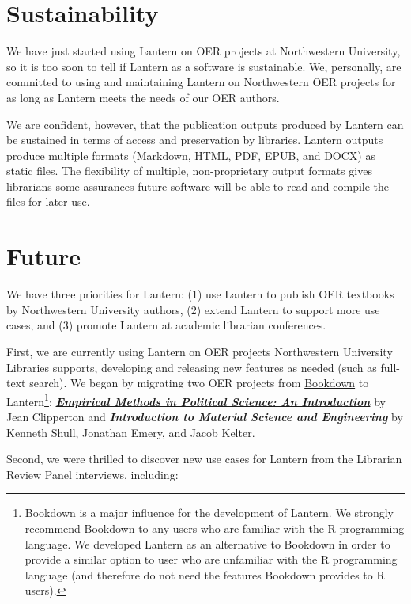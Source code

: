 \documentclass[
  11pt,
  openany]{book}
\begin{document}
\hypertarget{sustainability}{%
\section{Sustainability}\label{sustainability}}

We have just started using Lantern on OER projects at Northwestern University,
so it is too soon to tell if Lantern as a software is sustainable. We,
personally, are committed to using and maintaining Lantern on Northwestern OER
projects for as long as Lantern meets the needs of our OER authors.

We are confident, however, that the publication outputs produced by Lantern
can be sustained in terms of access and preservation by libraries. Lantern
outputs produce multiple formats (Markdown, HTML, PDF, EPUB, and DOCX) as
static files. The flexibility of multiple, non-proprietary output formats
gives librarians some assurances future software will be able to read and
compile the files for later use.

\hypertarget{future}{%
\section{Future}\label{future}}

We have three priorities for Lantern: (1) use Lantern to publish OER textbooks
by Northwestern University authors, (2) extend Lantern to support more use
cases, and (3) promote Lantern at academic librarian conferences.

First, we are currently using Lantern on OER projects Northwestern University
Libraries supports, developing and releasing new features as needed (such as
full-text search). We began by migrating two OER projects from
\href{https://bookdown.org/}{Bookdown} to Lantern\footnote{Bookdown is a major
  influence for the development of Lantern. We strongly recommend Bookdown to
  any users who are familiar with the R programming language. We developed
  Lantern as an alternative to Bookdown in order to provide a similar option
  to user who are unfamiliar with the R programming language (and therefore do
  not need the features Bookdown provides to R users).}:
\href{https://emps.northwestern.pub/}{\textbf{\emph{Empirical Methods in
Political Science: An Introduction}}} by Jean Clipperton and
\textbf{\emph{Introduction to Material Science and Engineering}} by Kenneth
Shull, Jonathan Emery, and Jacob Kelter.

Second, we were thrilled to discover new use cases for Lantern from the
Librarian Review Panel interviews, including:
\end{document}
